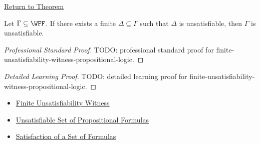 \newpage
{}
\label{prf:finite-unsatisfiability-witness-propositional-logic}

\begin{remark*}[Return]
\hyperref[thm:finite-unsatisfiability-witness-propositional-logic]{Return to Theorem}
\end{remark*}

\begin{theorem*}
Let \(\Gamma\subseteq\WFF\). If there exists a finite
\(\Delta\subseteq\Gamma\) such that \(\Delta\) is unsatisfiable, then
\(\Gamma\) is unsatisfiable.

\medskip
\end{theorem*}

\begin{proof}[Professional Standard Proof]
\LRAProofBodyStart
TODO: professional standard proof for finite-unsatisfiability-witness-propositional-logic.
\end{proof}

\begin{proof}[Detailed Learning Proof]
\LRAProofBodyStart
TODO: detailed learning proof for finite-unsatisfiability-witness-propositional-logic.
\end{proof}

\begin{remark*}
\end{remark*}

\begin{dependencies}
\begin{itemize}
  \item \hyperref[def:finite-unsatisfiability-witness-propositional-logic]{Finite Unsatisfiability Witness}
  \item \hyperref[def:unsatisfiable-set-of-propositional-formulas]{Unsatisfiable Set of Propositional Formulas}
  \item \hyperref[def:satisfaction-set-propositional-logic]{Satisfaction of a Set of Formulas}
\end{itemize}
\end{dependencies}

\clearpage
